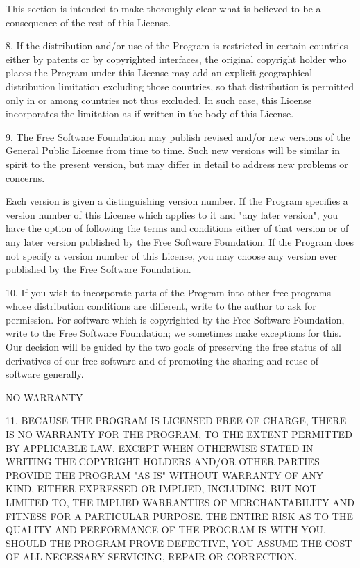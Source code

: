 This section is intended to make thoroughly clear what is believed to be a consequence of the rest of this License.

8. If the distribution and/or use of the Program is restricted in certain countries either by patents or by copyrighted interfaces, the original copyright holder who places the Program under this License may add an explicit geographical distribution limitation excluding those countries, so that distribution is permitted only in or among countries not thus excluded. In such case, this License incorporates the limitation as if written in the body of this License.

9. The Free Software Foundation may publish revised and/or new versions of the General Public License from time to time. Such new versions will be similar in spirit to the present version, but may differ in detail to address new problems or concerns.

Each version is given a distinguishing version number. If the Program specifies a version number of this License which applies to it and "any later version", you have the option of following the terms and conditions either of that version or of any later version published by the Free Software Foundation. If the Program does not specify a version number of this License, you may choose any version ever published by the Free Software Foundation.

10. If you wish to incorporate parts of the Program into other free programs whose distribution conditions are different, write to the author to ask for permission. For software which is copyrighted by the Free Software Foundation, write to the Free Software Foundation; we sometimes make exceptions for this. Our decision will be guided by the two goals of preserving the free status of all derivatives of our free software and of promoting the sharing and reuse of software generally.

NO WARRANTY

11. BECAUSE THE PROGRAM IS LICENSED FREE OF CHARGE, THERE IS NO WARRANTY FOR THE PROGRAM, TO THE EXTENT PERMITTED BY APPLICABLE LAW. EXCEPT WHEN OTHERWISE STATED IN WRITING THE COPYRIGHT HOLDERS AND/OR OTHER PARTIES PROVIDE THE PROGRAM "AS IS" WITHOUT WARRANTY OF ANY KIND, EITHER EXPRESSED OR IMPLIED, INCLUDING, BUT NOT LIMITED TO, THE IMPLIED WARRANTIES OF MERCHANTABILITY AND FITNESS FOR A PARTICULAR PURPOSE. THE ENTIRE RISK AS TO THE QUALITY AND PERFORMANCE OF THE PROGRAM IS WITH YOU. SHOULD THE PROGRAM PROVE DEFECTIVE, YOU ASSUME THE COST OF ALL NECESSARY SERVICING, REPAIR OR CORRECTION.

